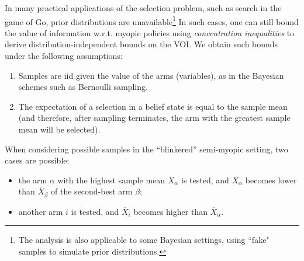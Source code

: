 \documentclass[]{article}
\begin{document}
In many practical applications of the selection problem, such as search in
the game of Go, prior distributions are unavailable\footnote{The analysis is also applicable to
some Bayesian settings, using ``fake" samples to simulate prior distributions.}
In such cases, one can still bound
the value of information w.r.t. myopic policies using {\em concentration
inequalities} to derive distribution-independent bounds on the
VOI. We obtain such bounds under the
following assumptions:
\begin{enumerate}
\item Samples are iid given the value of the arms (variables), as in the Bayesian schemes such as Bernoulli
sampling.
\item The expectation of a selection in a belief state is equal to the sample mean (and therefore,
   after sampling terminates, the arm with the greatest sample mean will be selected).
\end{enumerate}

When considering possible samples in the ``blinkered'' semi-myopic setting,
two cases are possible:
\begin{itemize}
\item the arm $\alpha$ with the highest sample mean $\overline
  X_\alpha$ is tested, and $\overline X_\alpha$ becomes lower than
  $\overline X_\beta$ of the second-best arm $\beta$;
\item another arm $i$ is tested, and $\overline X_i$ becomes higher
than $\overline X_\alpha$.
\end{itemize}
\end{document}
